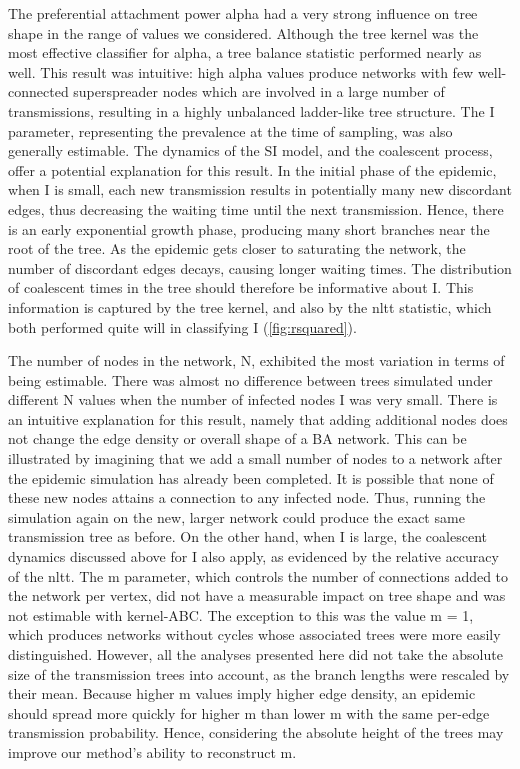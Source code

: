 The preferential attachment power \gls{alpha} had a very strong influence on
tree shape in the range of values we considered. Although the tree kernel was
the most effective classifier for \gls{alpha}, a tree balance statistic
performed nearly as well. This result was intuitive: high \gls{alpha} values
produce networks with few well-connected superspreader nodes which are involved
in a large number of transmissions, resulting in a highly unbalanced
ladder-like tree structure. The \gls{I} parameter, representing the prevalence
at the time of sampling, was also generally estimable. The dynamics of the
\gls{SI} model, and the coalescent process, offer a potential explanation for
this result. In the initial phase of the epidemic, when \gls{I} is small, each
new transmission results in potentially many new discordant edges, thus
decreasing the waiting time until the next transmission. Hence, there is an
early exponential growth phase, producing many short branches near the root of
the tree. As the epidemic gets closer to saturating the network, the number of
discordant edges decays, causing longer waiting times. The distribution of
coalescent times in the tree should therefore be informative about \gls{I}.
This information is captured by the tree kernel, and also by the \gls{nltt}
statistic, which both performed quite will in classifying \gls{I}
(\cref{fig:rsquared}).

The number of nodes in the network, \gls{N}, exhibited the most variation in
terms of being estimable. There was almost no difference between trees
simulated under different \gls{N} values when the number of infected nodes
\gls{I} was very small. There is an intuitive explanation for this result,
namely that adding additional nodes does not change the edge density or overall
shape of a \gls{BA} network. This can be illustrated by imagining that we add a
small number of nodes to a network after the epidemic simulation has already
been completed. It is possible that none of these new nodes attains a
connection to any infected node. Thus, running the simulation again on the new,
larger network could produce the exact same transmission tree as before. On the
other hand, when \gls{I} is large, the coalescent dynamics discussed above for
\gls{I} also apply, as evidenced by the relative accuracy of the \gls{nltt}.
The \gls{m} parameter, which controls the number of connections added to the
network per vertex, did not have a measurable impact on tree shape and was not
estimable with kernel-ABC. The exception to this was the value \gls{m} = 1,
which produces networks without cycles whose associated trees were more easily
distinguished. However, all the analyses presented here did not take the
absolute size of the transmission trees into account, as the branch lengths
were rescaled by their mean. Because higher \gls{m} values imply higher edge
density, an epidemic should spread more quickly for higher \gls{m} than lower
\gls{m} with the same per-edge transmission probability.  Hence, considering
the absolute height of the trees may improve our method's ability to
reconstruct \gls{m}.

